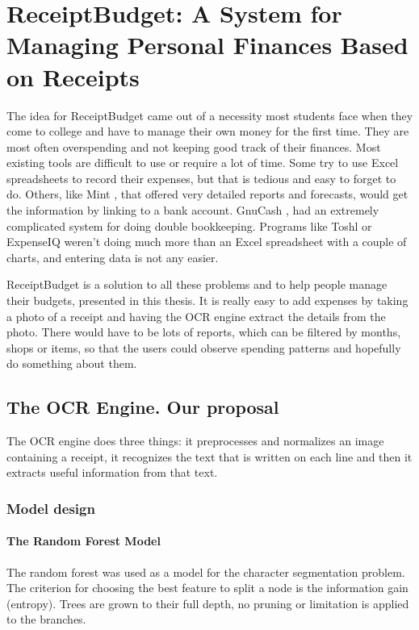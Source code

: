 \chapter{ReceiptBudget: A System for Managing Personal Finances Based on Receipts}
\label{chap:application}

The idea for ReceiptBudget came out of a necessity most students face when they come to college and have to manage their own money for the first time. They are most often overspending and not keeping good track of their finances. Most existing tools are difficult to use or require a lot of time. Some try to use Excel spreadsheets to record their expenses, but that is tedious and easy to forget to do. Others, like Mint \cite{mint}, that offered very detailed reports and forecasts, would get the information by linking to a bank account. GnuCash \cite{gnucash}, had an extremely complicated system for doing double bookkeeping. Programs like Toshl \cite{toshl} or ExpenseIQ \cite{expenseiq} weren't doing much more than an Excel spreadsheet with a couple of charts, and entering data is not any easier. 

ReceiptBudget is a solution to all these problems and to help people manage their budgets, presented in this thesis. It is  really easy to add expenses by taking a photo of a receipt and having the OCR engine extract the details from the photo. There would have to be lots of reports, which can be filtered by months, shops or items, so that the users could observe spending patterns and hopefully do something about them.

\section{The OCR Engine. Our proposal}
The OCR engine does three things: it preprocesses and normalizes an image containing a receipt, it recognizes the text that is written on each line and then it extracts useful information from that text. 

\subsection{Model design}

\subsubsection{The Random Forest Model}
The random forest was used as a model for the character segmentation problem. The criterion for choosing the best feature to split a node is the information gain (entropy). Trees are grown to their full depth, no pruning or limitation is applied to the branches. 

